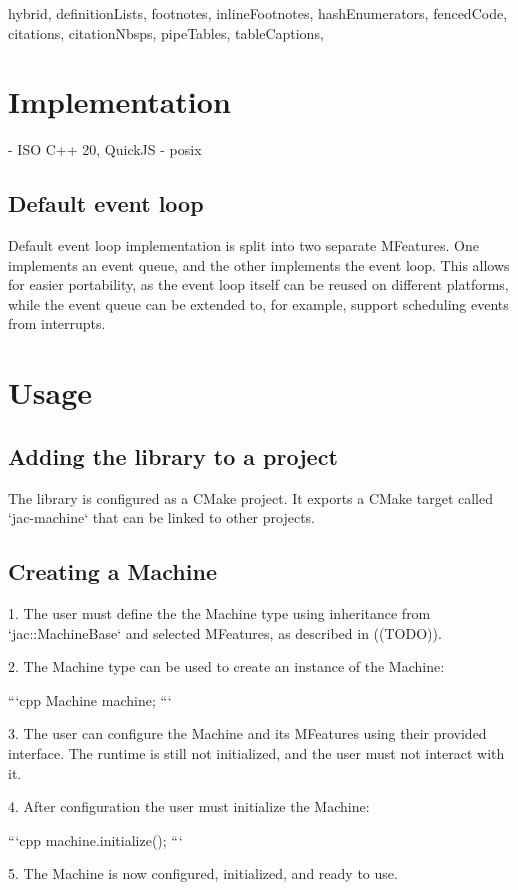\begin{markdown*}{%
  hybrid,
  definitionLists,
  footnotes,
  inlineFootnotes,
  hashEnumerators,
  fencedCode,
  citations,
  citationNbsps,
  pipeTables,
  tableCaptions,
}
\section{Implementation}

- ISO C++ 20, QuickJS - posix

\subsection{Default event loop}

Default event loop implementation is split into two separate MFeatures. One implements an event queue, and the other implements the event loop. This allows for easier portability, as the event loop itself can be reused on different platforms, while the event queue can be extended to, for example, support scheduling events from interrupts.


\section{Usage}

\subsection{Adding the library to a project}

The library is configured as a CMake project. It exports a CMake target called `jac-machine` that can be linked to other projects.

\subsection{Creating a Machine}

 1. The user must define the the Machine type using inheritance from `jac::MachineBase` and selected MFeatures, as described in ((TODO)).

 2. The Machine type can be used to create an instance of the Machine:

```cpp
Machine machine;
```

 3. The user can configure the Machine and its MFeatures using their provided interface. The runtime is still not initialized, and the user must not interact with it.

 4. After configuration the user must initialize the Machine:

```cpp
machine.initialize();
```

 5. The Machine is now configured, initialized, and ready to use.


\end{markdown*}
